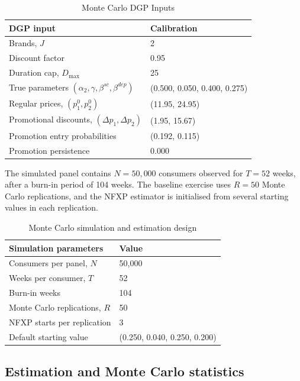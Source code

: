 \begin{table}[H]
\centering
\caption{Monte Carlo DGP Inputs}
\label{tab:mc_dgp_primitives}
\begin{tabular}{ll}
\toprule
DGP input & Calibration \\
\midrule
Brands, $J$ & 2 \\
Discount factor & 0.95 \\
Duration cap, $D_{\max}$ & 25 \\
True parameters $(\alpha_2,\gamma,\beta^{sc},\beta^{dep})$ & (0.500, 0.050, 0.400, 0.275) \\
Regular prices, $(p^0_1,p^0_2)$ & (11.95, 24.95) \\
Promotional discounts, $(\Delta p_1,\Delta p_2)$ & (1.95, 15.67) \\
Promotion entry probabilities & (0.192, 0.115) \\
Promotion persistence & 0.000 \\
\bottomrule
\end{tabular}
\end{table}

\noindent
The simulated panel contains $N=50{,}000$ consumers observed for $T=52$ weeks, after a burn-in period of 104 weeks. The baseline exercise uses $R=50$ Monte Carlo replications, and the NFXP estimator is initialised from several starting values in each replication.

\begin{table}[H]
\centering
\caption{Monte Carlo simulation and estimation design}
\label{tab:mc_sim_design}
\begin{tabular}{ll}
\toprule
Simulation parameters & Value \\
\midrule
Consumers per panel, $N$ & 50,000 \\
Weeks per consumer, $T$ & 52 \\
Burn-in weeks & 104 \\
Monte Carlo replications, $R$ & 50 \\
NFXP starts per replication & 3 \\
Default starting value & (0.250, 0.040, 0.250, 0.200) \\
\bottomrule
\end{tabular}
\end{table}

\subsection{Estimation and Monte Carlo statistics}

